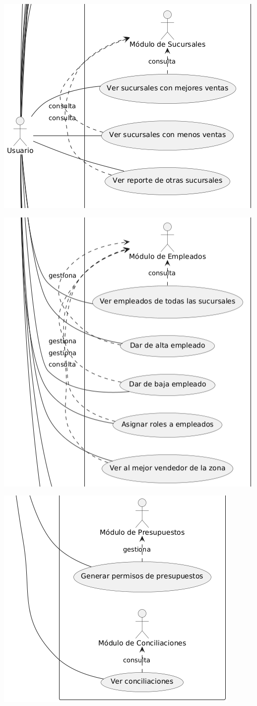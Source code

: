 \documentclass[protocolo.tex]{subfiles}
\begin{document}
\includegraphics[scale=0.5]{Imagenes/zaeEjept3.png}


\includegraphics[scale=0.5]{Imagenes/zaeEjept4.png}


\includegraphics[scale=0.5]{Imagenes/zaeEjept5.png}
\end{document}
